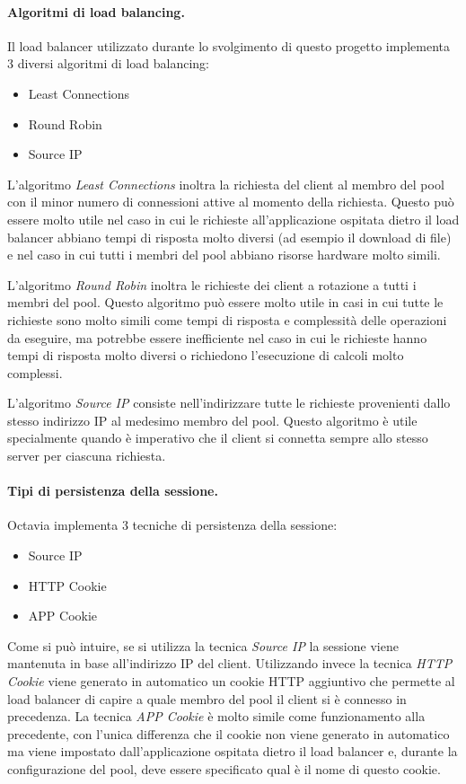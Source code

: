 \paragraph{Algoritmi di load balancing.}
Il load balancer utilizzato durante lo svolgimento di questo progetto implementa 3 diversi algoritmi di load balancing:
\begin{itemize}
    \item Least Connections
    \item Round Robin
    \item Source IP
\end{itemize}

L'algoritmo \emph{Least Connections} inoltra la richiesta del client al membro del pool con il minor numero di connessioni attive al momento della richiesta. Questo può essere molto utile nel caso in cui le richieste all'applicazione ospitata dietro il load balancer abbiano tempi di risposta molto diversi (ad esempio il download di file) e nel caso in cui tutti i membri del pool abbiano risorse hardware molto simili.

L'algoritmo \emph{Round Robin} inoltra le richieste dei client a rotazione a tutti i membri del pool. Questo algoritmo può essere molto utile in casi in cui tutte le richieste sono molto simili come tempi di risposta e complessità delle operazioni da eseguire, ma potrebbe essere inefficiente nel caso in cui le richieste hanno tempi di risposta molto diversi o richiedono l'esecuzione di calcoli molto complessi.

L'algoritmo \emph{Source IP} consiste nell'indirizzare tutte le richieste provenienti dallo stesso indirizzo IP al medesimo membro del pool. Questo algoritmo è utile specialmente quando è imperativo che il client si connetta sempre allo stesso server per ciascuna richiesta.


\paragraph{Tipi di persistenza della sessione.}
Octavia implementa 3 tecniche di persistenza della sessione:
\begin{itemize}
    \item Source IP
    \item HTTP Cookie
    \item APP Cookie
\end{itemize}

Come si può intuire, se si utilizza la tecnica \emph{Source IP} la sessione viene mantenuta in base all'indirizzo IP del client. Utilizzando invece la tecnica \emph{HTTP Cookie} viene generato in automatico un cookie HTTP aggiuntivo che permette al load balancer di capire a quale membro del pool il client si è connesso in precedenza. La tecnica \emph{APP Cookie} è molto simile come funzionamento alla precedente, con l'unica differenza che il cookie non viene generato in automatico ma viene impostato dall'applicazione ospitata dietro il load balancer e, durante la configurazione del pool, deve essere specificato qual è il nome di questo cookie.

